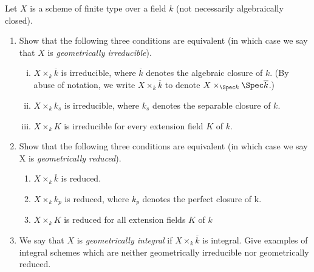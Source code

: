 \begin{exercise}
	Let $X $ is a scheme of finite type over a field $k $ (not necessarily algebraically closed).
	\begin{enumerate}
		\item Show that the following three conditions are equivalent (in which case we say that $X $ is \textit{geometrically irreducible}).
		\begin{enumerate}[(i)]
			\item $X \times _k \overline{k}  $ is irreducible, where $\overline{k}  $ denotes the algebraic closure of $k $. (By abuse of notation, we write $X \times _k \overline{k}  $ to denote $X \times _{\Spec k} \Spec \overline{k}$.)
			\item $X \times _k k_s $ is irreducible, where $k_s $ denotes the separable closure of $k $.
			\item $X \times _k K $ is irreducible for every extension field $K $ of $k $.
		\end{enumerate}
		\item Show that the following three conditions are equivalent (in which case we say X is \textit{geometrically reduced}).
		\begin{enumerate}
			\item $X \times_k \overline{k}$ is reduced.
			\item $X \times_k k_p$ is reduced, where $k_p $ denotes the perfect closure of k.
			\item $X \times_k K$ is reduced for all extension fields $K$ of $k $
		\end{enumerate}
		\item We say that $X $ is \textit{geometrically integral} if $X \times _k \overline{k}  $ is integral. Give examples of integral schemes which are neither geometrically irreducible nor geometrically reduced.
	\end{enumerate}
\end{exercise}
